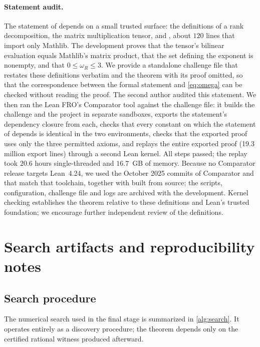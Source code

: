 \documentclass[11pt,a4paper]{article}
\begin{document}
\paragraph{Statement audit.} The statement of  depends on a small trusted surface: the definitions of a rank decomposition, the matrix multiplication tensor, and , about $120$ lines that import only Mathlib. The development proves that the tensor's bilinear evaluation equals Mathlib's matrix product, that the set defining the exponent is nonempty, and that $0\le\omega_R\le3$. We provide a standalone challenge file that restates these definitions verbatim and the theorem with its proof omitted, so that the correspondence between the formal statement and \cref{eq:omega} can be checked without reading the proof. The second author audited this statement. We then ran the Lean FRO's Comparator tool against the challenge file: it builds the challenge and the project in separate sandboxes, exports the statement's dependency closure from each, checks that every constant on which the statement of  depends is identical in the two environments, checks that the exported proof uses only the three permitted axioms, and replays the entire exported proof (19.3 million export lines) through a second Lean kernel. All steps passed; the replay took $20.6$ hours single-threaded and $16.7$~GB of memory. Because no Comparator release targets Lean~4.24, we used the October 2025 commits of Comparator and  that match that toolchain, together with  built from source; the scripts, configuration, challenge file and logs are archived with the development. Kernel checking establishes the theorem relative to these definitions and Lean's trusted foundation; we encourage further independent review of the definitions.

\section{Search artifacts and reproducibility notes}\label{app:search}

\subsection{Search procedure}

The numerical search used in the final stage is summarized in \cref{alg:search}. It operates entirely as a discovery procedure; the theorem depends only on the certified rational witness produced afterward.
\end{document}
